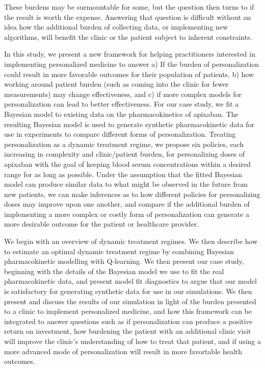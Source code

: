 These burdens may be surmountable for some, but the question then turns to if the result is worth the expense.  Answering that question is difficult without an idea how the additional burden of collecting data, or implementing new algorithms, will benefit the clinic or the patient subject to inherent constraints. 

 In this study, we present a new framework for helping practitioners interested in implementing personalized medicine to answer a) If the burden of personalization could result in more favorable outcomes for their population of patients, b) how working around patient burden (such as coming into the clinic for fewer measurements) may change effectiveness, and c) if more complex models for personalization can lead to better effectiveness. For our case study, we fit a Bayesian model to existing data on the pharmacokinetics of apixaban.  The resulting Bayesian model is used to generate synthetic pharmacokinetic data for use in experiments to compare different forms of personalization. Treating personalization as a dynamic treatment regime, we propose six policies, each increasing in complexity and clinic/patient burden, for personalizing doses of apixaban with the goal of keeping blood serum concentrations within a desired range for as long as possible. Under the assumption that the fitted Bayesian model can produce similar data to what might be observed in the future from new patients, we can make inferences as to how different policies for personalizing doses may improve upon one another, and compare if the additional burden of implementing a more complex or costly form of personalization can generate a more desirable outcome for the patient or healthcare provider.  

We begin with an overview of dynamic treatment regimes.  We then describe how to estimate an optimal dynamic treatment regime  by combining Bayesian pharmacokinetic modelling with Q-learning.  We then present our case study, beginning with the details of the Bayesian model we use to fit the real pharmacokinetic data, and present model fit diagnostics to argue that our model is satisfactory for generating synthetic data for use in our simulations. We then present and discuss the results of our simulation in light of the burden presented to a clinic to implement personalized medicine, and how this framework can be integrated to answer questions such as if personalization can produce a positive return on investment, how burdening the patient with an additional clinic visit will improve the clinic's understanding of how to treat that patient, and if using a more advanced mode of personalization will result in more favortable health outcomes.

